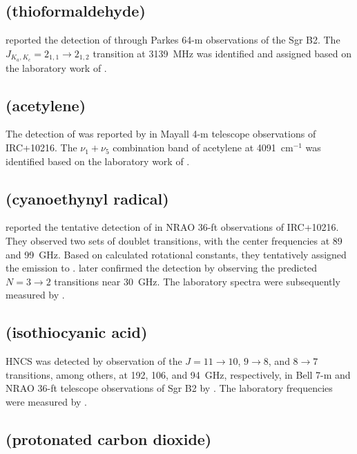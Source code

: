\documentclass[twocolumn]{aastex631}
\begin{document}
    \subsection{ (thioformaldehyde)}
	\label{H2CS}
	
	\citet{Sinclair:1973ft} reported the detection of  through Parkes 64-m observations of the Sgr B2.  The $J_{K_a,K_c} = 2_{1,1}\rightarrow2_{1,2}$ transition at 3139~MHz was identified and assigned based on the laboratory work of \citet{Johnson:1970yd}.
	
	\subsection{ (acetylene)}
	\label{C2H2}
	
	The detection of  was reported by \citet{Ridgway:1976il} in Mayall 4-m telescope observations of IRC+10216.  The $\nu_1 + \nu_5$ combination band of acetylene at 4091~cm$^{-1}$ was identified based on the laboratory work of \citet{Baldacci:1973ju}.
	
	\subsection{ (cyanoethynyl radical)}
	\label{C3N}
	
	\citet{Guelin:1977kd} reported the tentative detection of  in NRAO 36-ft observations of IRC+10216.  They observed two sets of doublet transitions, with the center frequencies at 89 and 99~GHz.  Based on calculated rotational constants, they tentatively assigned the emission to . \citet{Friberg:1980lc} later confirmed the detection by observing the predicted $N  = 3\rightarrow2$ transitions near 30~GHz.  The laboratory spectra were subsequently measured by \citet{Gottlieb:1983yd}.
	
	\subsection{ (isothiocyanic acid)}
	\label{HNCS}
	
	HNCS was detected by observation of the $J = 11\rightarrow10$, $9\rightarrow8$, and $8\rightarrow7$ transitions, among others, at 192, 106, and 94~GHz, respectively, in Bell 7-m and NRAO 36-ft telescope observations of Sgr B2 by \citet{Frerking:1979yd}.  The laboratory frequencies were measured by \citet{Kewley:1963cn}. 
	
	\subsection{ (protonated carbon dioxide)}
	\label{HOCO+}
	
\end{document}
